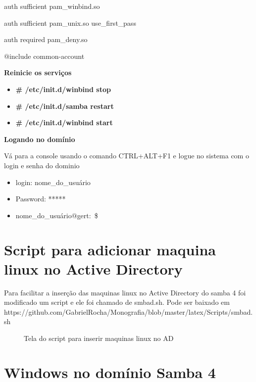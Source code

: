 auth sufficient pam\_winbind.so

auth sufficient pam\_unix.so use\_first\_pass

auth required   pam\_deny.so

$@$include common-account



\textbf{Reinicie os serviços}

\begin{itemize}
	\item \textbf{\# /etc/init.d/winbind stop}
	\item \textbf{\# /etc/init.d/samba restart}
	\item \textbf{\# /etc/init.d/winbind start}
\end{itemize}

\textbf{Logando no domínio}

Vá para a console usando o comando CTRL+ALT+F1 e logue no sistema com o login e senha do dominio

\begin{itemize}
	\item {login: nome\_do\_usuário}
	\item {Password: *****}
	\item {nome\_do\_usuário$@$gert:~\$}
\end{itemize}

\section{Script para adicionar maquina linux no Active Directory}

Para facilitar a inserção das maquinas linux no Active Directory do samba 4 foi modificado um script e ele foi chamado de smbad.sh. Pode ser baixado em https://github.com/GabrielRocha/Monografia/blob/master/latex/Scripts/smbad.sh

\begin{figure}[ht]
   	\centering
   	\caption{Tela do script para inserir maquinas linux no AD}
    \label{smbad}
\end{figure}

\section{Windows no domínio Samba 4}